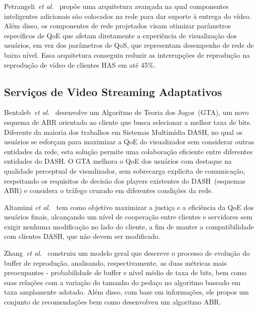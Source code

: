 
Petrangeli~\textit{et al.}~\cite{petrangeli2019IM}
propõe uma arquitetura avançada na qual componentes inteligentes adicionais são colocados na rede para dar suporte à entrega do vídeo. Além disso, os componentes de rede projetados visam otimizar parâmetros específicos de QoE que afetam diretamente a experiência de visualização dos usuários, em vez dos parâmetros de QoS, que representam desempenho de rede de baixo nível.
Essa arquitetura conseguiu reduzir as interrupções de reprodução na reprodução de vídeo de clientes HAS em até 45\%.


\subsection{Serviços de Video Streaming Adaptativos}


Bentaleb~\textit{et al.}~\cite{bentaleb:2018:MSys} desenvolve um Algoritmo de Teoria dos Jogos~(GTA), um novo esquema de ABR orientado ao cliente que busca selecionar a melhor taxa de bits.
Diferente da maioria dos trabalhos em Sistemas Multimídia DASH, no qual os usuários se esforçam para maximizar a QoE do visualizador sem considerar outras entidades da rede, esta solução permite uma colaboração eficiente entre diferentes entidades do DASH. 
O GTA melhora o QoE dos usuários com destaque na qualidade perceptual de visualizador, sem sobrecarga explícita de comunicação, respeitando os requisitos de decisão dos players existentes do DASH~(esquemas ABR) e considera o tráfego cruzado em diferentes condições da rede. 

Altamimi \textit{et al.}~\cite{KreuzbergerWorkshop2016}
tem como objetivo maximizar a justiça e a eficiência da QoE dos usuários finais, alcançando um nível de cooperação entre clientes e servidores sem exigir nenhuma modificação no lado do cliente, a fim de manter a compatibilidade com clientes DASH, que não devem ser modificado.

Zhang~\textit{et al.}~\cite{zhangINFOCOM17} 
construiu um modelo geral que descreve o processo de evolução do buffer de reprodução, analisando, respectivamente, as duas métricas mais preocupantes - probabilidade de buffer e nível médio de taxa de bits, bem como suas relações com a variação do tamanho do pedaço no algoritmo baseado em taxa amplamente adotado. 
Além disso, com base em informações, ele propos um conjunto de recomendações bem como desenvolveu um algoritmo ABR.


